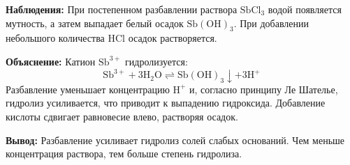 \documentclass[a4paper,12pt]{article}
\begin{document}
	\textbf{Наблюдения:}
	При постепенном разбавлении раствора $\mathrm{SbCl_3}$ водой появляется мутность, 
	а затем выпадает белый осадок $\mathrm{Sb(OH)_3}$.  
	При добавлении небольшого количества $\mathrm{HCl}$ осадок растворяется.
	
	\textbf{Объяснение:}
	Катион $\mathrm{Sb^{3+}}$ гидролизуется:
	\[
	\mathrm{Sb^{3+} + 3H_2O \rightleftharpoons Sb(OH)_3 \downarrow + 3H^+}
	\]
	Разбавление уменьшает концентрацию $\mathrm{H^+}$ и, согласно принципу Ле Шателье, 
	гидролиз усиливается, что приводит к выпадению гидроксида.  
	Добавление кислоты сдвигает равновесие влево, растворяя осадок.
	
	\textbf{Вывод:}
	Разбавление усиливает гидролиз солей слабых оснований.  
	Чем меньше концентрация раствора, тем больше степень гидролиза.
\end{document}
